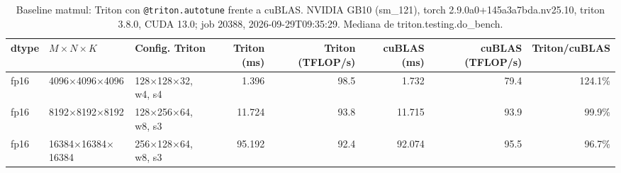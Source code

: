 \begin{table}[htbp]
  \centering\small
  \begin{tabular}{lllrrrrr}
    \toprule
    dtype & $M \times N \times K$ & Config. Triton & Triton (ms) & Triton (TFLOP/s) & cuBLAS (ms) & cuBLAS (TFLOP/s) & Triton/cuBLAS \\
    \midrule
    fp16 & 4096$\times$4096$\times$4096 & 128$\times$128$\times$32, w4, s4 & 1.396 & 98.5 & 1.732 & 79.4 & 124.1\% \\
    fp16 & 8192$\times$8192$\times$8192 & 128$\times$256$\times$64, w8, s3 & 11.724 & 93.8 & 11.715 & 93.9 & 99.9\% \\
    fp16 & 16384$\times$16384$\times$16384 & 256$\times$128$\times$64, w8, s3 & 95.192 & 92.4 & 92.074 & 95.5 & 96.7\% \\
    \bottomrule
  \end{tabular}
  \caption{Baseline matmul: Triton con \texttt{@triton.autotune} frente a cuBLAS. NVIDIA GB10 (sm\_121), torch 2.9.0a0+145a3a7bda.nv25.10, triton 3.8.0, CUDA 13.0; job 20388, 2026-09-29T09:35:29. Mediana de triton.testing.do\_bench.}
  \label{tab:baseline-matmul}
\end{table}
